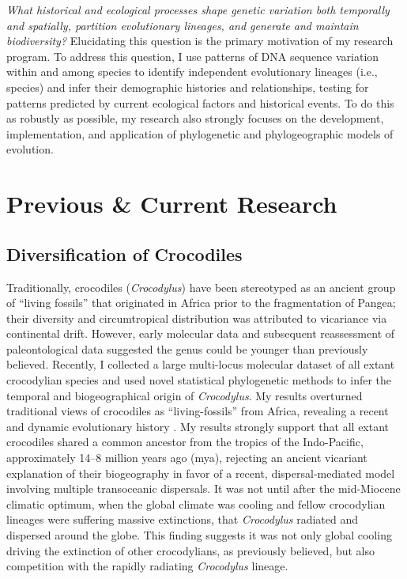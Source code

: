 \documentclass[10pt]{article}
\begin{document}
\raggedright
\singlespacing

\emph{What historical and ecological processes shape genetic variation both temporally and spatially, partition evolutionary lineages, and generate and maintain biodiversity?}
Elucidating this question is the primary motivation of my research program.
To address this question, I use patterns of DNA sequence variation within and among species to identify independent evolutionary lineages (i.e., species) and infer their demographic histories and relationships, testing for patterns predicted by current ecological factors and historical events.
To do this as robustly as possible, my research also strongly focuses on the development, implementation, and application of phylogenetic and phylogeographic models of evolution.

\section*{Previous \& Current Research}
\subsection*{Diversification of Crocodiles}
Traditionally, crocodiles (\emph{Crocodylus}) have been stereotyped as an ancient group of ``living fossils'' that originated in Africa prior to the fragmentation of Pangea; their diversity and circumtropical distribution was attributed to vicariance via continental drift.
However, early molecular data and subsequent reassessment of paleontological data suggested the genus could be younger than previously believed.
Recently, I collected a large multi-locus molecular dataset of all extant crocodylian species and used novel statistical phylogenetic methods to infer the temporal and biogeographical origin of \emph{Crocodylus}.
My results overturned traditional views of crocodiles as ``living-fossils'' from Africa, revealing a recent and dynamic evolutionary history .
My results strongly support that all extant crocodiles shared a common ancestor from the tropics of the Indo-Pacific, approximately 14--8 million years ago (mya), rejecting an ancient vicariant explanation of their biogeography in favor of a recent, dispersal-mediated model involving multiple transoceanic dispersals.
It was not until after the mid-Miocene climatic optimum, when the global climate was cooling and fellow crocodylian lineages were suffering massive extinctions, that \emph{Crocodylus} radiated and dispersed around the globe.
This finding suggests it was not only global cooling driving the extinction of other crocodylians, as previously believed, but also competition with the rapidly radiating \emph{Crocodylus} lineage.
\end{document}
